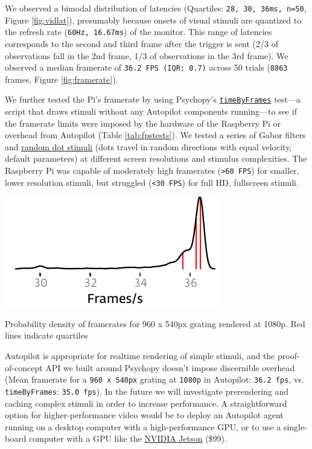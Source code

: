 We observed a bimodal distribution of latencies (Quartiles: \texttt{28, 30, 36ms, n=50}, Figure \ref{fig:vidlat}), presumably because onsets of visual stimuli are quantized to the refresh rate (\texttt{60Hz, 16.67ms}) of the monitor. This range of latencies corresponds to the second and third frame after the trigger is sent (2/3 of observations fall in the 2nd frame, 1/3 of observations in the 3rd frame). We observed a median framerate of \texttt{36.2 FPS (IQR: 0.7)} across 50 trials (\texttt{8863} frames, Figure \ref{fig:framerate}). 

We further tested the Pi's framerate by using Psychopy's \href{https://github.com/psychopy/psychopy/blob/3.1/psychopy/demos/coder/timing/timeByFrames.py}{\texttt{timeByFrames}} test---a script that draws stimuli without any Autopilot components running---to see if the framerate limits were imposed by the hardware of the Raspberry Pi or overhead from Autopilot (Table \ref{tab:fpstests}). We tested a series of Gabor filters and \href{https://www.psychopy.org/api/visual/dotstim.html#psychopy.visual.DotStim}{random dot stimuli} (dots travel in random directions with equal velocity, default parameters) at different screen resolutions and stimulus complexities. The Raspberry Pi was capable of moderately high framerates (\texttt{>60 FPS}) for smaller, lower resolution stimuli, but struggled (\texttt{<30 FPS}) for full HD, fullscreen stimuli.

\clearpage

\begin{marginfigure}[0.5cm]
\includegraphics[]{figures/test_7_fps.pdf}
\caption{Probability density of framerates for 960 x 540px grating rendered at 1080p. Red lines indicate quartiles}
\label{fig:framerate}
\end{marginfigure}

Autopilot is appropriate for realtime rendering of simple stimuli, and the proof-of-concept API we built around Psychopy doesn't impose discernible overhead (Mean framerate for a \texttt{960 x 540px} grating at \texttt{1080p} in Autopilot: \texttt{36.2 fps}, vs. \texttt{timeByFrames}: \texttt{35.0 fps}). In the future we will investigate prerendering and caching complex stimuli in order to increase performance. A straightforward option for higher-performance video would be to deploy an Autopilot agent running on a desktop computer with a high-performance GPU, or to use a single-board computer with a GPU like the \href{https://www.nvidia.com/en-us/autonomous-machines/embedded-systems/jetson-nano/}{NVIDIA Jetson} (\$99).

